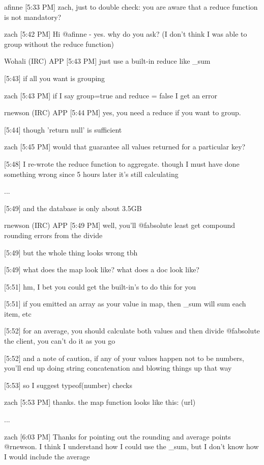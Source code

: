afinne [5:33 PM]
zach, just to double check: you are aware that a reduce function is not mandatory?

zach [5:42 PM]
Hi @afinne - yes. why do you ask? (I don't think I was able to group without the reduce function)

Wohali (IRC) APP [5:43 PM]
just use a built-in reduce like \_sum

[5:43]
if all you want is grouping

zach [5:43 PM]
if I say group=true and reduce = false I get an error

rnewson (IRC) APP [5:44 PM]
yes, you need a reduce if you want to group.

[5:44]
though 'return null' is sufficient

zach [5:45 PM]
would that guarantee all values returned for a particular key?

[5:48]
I re-wrote the reduce function to aggregate. though I must have done something wrong since 5 hours later it's still calculating

...

[5:49]
and the database is only about 3.5GB

rnewson (IRC) APP [5:49 PM]
well, you'll @fabsolute least get compound rounding errors from the divide

    [5:49]
but the whole thing looks wrong tbh

    [5:49]
what does the map look like? what does a doc look like?

[5:51]
hm, I bet you could get the built-in's to do this for you

    [5:51]
if you emitted an array as your value in map, then \_sum will sum each item, etc

    [5:52]
for an average, you should calculate both values and then divide @fabsolute the client, you can't do it as you go

    [5:52]
and a note of caution, if any of your values happen not to be numbers, you'll end up doing string concatenation and blowing things up that way

    [5:53]
so I suggest typeof(number) checks

zach [5:53 PM]
thanks. the map function looks like this: (url)

...

zach [6:03 PM]
Thanks for pointing out the rounding and average points @rnewson. I think I understand how I could use the \_sum, but I don't know how I would include the average

